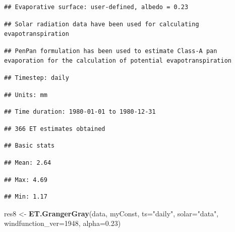 \documentclass[
]{book}
\newenvironment{Shaded}{\begin{snugshade}}{\end{snugshade}}
\newcommand{\DataTypeTok}[1]{\textcolor[rgb]{0.13,0.29,0.53}{#1}}
\newcommand{\DecValTok}[1]{\textcolor[rgb]{0.00,0.00,0.81}{#1}}
\newcommand{\FloatTok}[1]{\textcolor[rgb]{0.00,0.00,0.81}{#1}}
\newcommand{\KeywordTok}[1]{\textcolor[rgb]{0.13,0.29,0.53}{\textbf{#1}}}
\newcommand{\NormalTok}[1]{#1}
\newcommand{\StringTok}[1]{\textcolor[rgb]{0.31,0.60,0.02}{#1}}
\begin{document}
\begin{verbatim}
## Evaporative surface: user-defined, albedo = 0.23
\end{verbatim}

\begin{verbatim}
## Solar radiation data have been used for calculating evapotranspiration
\end{verbatim}

\begin{verbatim}
## PenPan formulation has been used to estimate Class-A pan evaporation for the calculation of potential evapotranspiration
\end{verbatim}

\begin{verbatim}
## Timestep: daily
\end{verbatim}

\begin{verbatim}
## Units: mm
\end{verbatim}

\begin{verbatim}
## Time duration: 1980-01-01 to 1980-12-31
\end{verbatim}

\begin{verbatim}
## 366 ET estimates obtained
\end{verbatim}

\begin{verbatim}
## Basic stats
\end{verbatim}

\begin{verbatim}
## Mean: 2.64
\end{verbatim}

\begin{verbatim}
## Max: 4.69
\end{verbatim}

\begin{verbatim}
## Min: 1.17
\end{verbatim}

\begin{Shaded}
\begin{Highlighting}[]
\NormalTok{res8 <-}\StringTok{ }\KeywordTok{ET.GrangerGray}\NormalTok{(data, myConst, }\DataTypeTok{ts=}\StringTok{"daily"}\NormalTok{, }
                       \DataTypeTok{solar=}\StringTok{"data"}\NormalTok{, }\DataTypeTok{windfunction_ver=}\DecValTok{1948}\NormalTok{, }\DataTypeTok{alpha=}\FloatTok{0.23}\NormalTok{)}
\end{Highlighting}
\end{Shaded}
\end{document}
